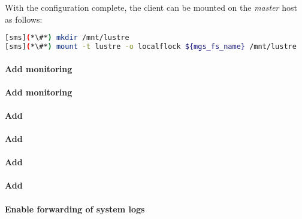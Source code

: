 \documentclass[letterpaper]{article}
\begin{document}
With the \Lustre{} configuration complete, the client can be mounted on the {\em master}
host as follows:
\begin{lstlisting}[language=bash,keywords={},upquote=true]
[sms](*\#*) mkdir /mnt/lustre
[sms](*\#*) mount -t lustre -o localflock ${mgs_fs_name} /mnt/lustre
\end{lstlisting}

\paragraph{Add \Nagios{} monitoring}


\clearpage
\paragraph{Add \Ganglia{} monitoring}


\paragraph{Add \clustershell{}}


\paragraph{Add \mrsh{}}


\paragraph{Add \genders{}}



\paragraph{Add \conman{}} \label{sec:add_conman}


\clearpage
\paragraph{Enable forwarding of system logs} \label{sec:add_syslog}

\end{document}
